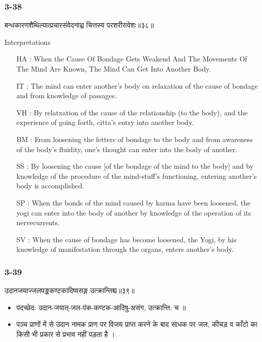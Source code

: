 \begin{frame}[fragile]\frametitle{3-38}
\begin{sanskrit}
बन्धकारणशैथिल्यात्प्रचारसंवेदनाच्च चित्तस्य परशरीरावेशः॥३८॥
\end{sanskrit}

Interpretations
\begin{itemize}	
\item [HA]: When the Cause Of Bondage Gets Weakend And The Movements Of The Mind Are Known, The Mind Can Get Into Another Body.
\item [IT]: The mind can enter another’s body on relaxation of the cause of bondage and from knowledge of passages.
\item [VH]: By relatxation of the cause of the relationship (to the body), and the experience of going forth, citta’s entry into another body.
\item [BM]: From loosening the fetters of bondage to the body and from awareness of the body’s fluidity, one’s thought can enter into the body of another.
\item [SS]: By loosening the cause [of the bondage of the mind to the body] and by knowledge of the procedure of the mind-stuff’s functioning, entering another’s body is accomplished.
\item [SP]: When the bonds of the mind caused by karma have been loosened, the yogi can enter into the body of another by knowledge of the operation of its nervecurrents.
\item [SV]: When the cause of bondage has become loosened, the Yogi, by his knowledge of manifestation through the organs, enters another’s body. 
\end{itemize}
\end{frame}

\begin{frame}[fragile]\frametitle{3-39}
\begin{sanskrit}
उदानजयाज्जलपङ्ककण्टकादिष्वसङ्ग उत्क्रान्तिश्च॥३९॥
\end{sanskrit}

\begin{itemize}
\item पदच्छेद:  उदान-जयात्-जल-पंक-कण्टक-आदिषु-असंग, उत्क्रान्ति: च ॥
\item पञ्च प्राणों में से उदान नामक प्राण पर विजय प्राप्त करने के बाद साधक पर  जल, कीचड़ व काँटो का किसी भी प्रकार से प्रभाव नहीं पड़ता है ।
\end{itemize}
\end{frame}

